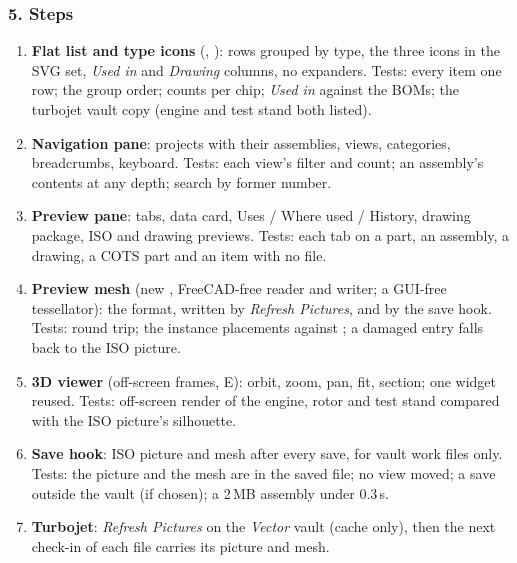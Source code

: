 \subsubsection*{5. Steps}

\begin{enumerate}[nosep]
  \item \textbf{Flat list and type icons} (, ): rows grouped by
        type, the three icons in the SVG set, \emph{Used in} and \emph{Drawing} columns, no expanders. Tests: every item
        one row; the group order; counts per chip; \emph{Used in} against the BOMs; the turbojet vault copy (engine and
        test stand both listed).
  \item \textbf{Navigation pane}: projects with their assemblies, views, categories, breadcrumbs, keyboard. Tests:
        each view's filter and count; an assembly's contents at any depth; search by former number.
  \item \textbf{Preview pane}: tabs, data card, Uses / Where used / History, drawing package, ISO and drawing previews.
        Tests: each tab on a part, an assembly, a drawing, a COTS part and an item with no file.
  \item \textbf{Preview mesh} (new , FreeCAD-free reader and writer; a GUI-free
        tessellator): the format, written by \emph{Refresh Pictures}, and by the save hook. Tests: round trip; the
        instance placements against ; a damaged entry falls back to the ISO picture.
  \item \textbf{3D viewer} (off-screen frames, E): orbit, zoom, pan, fit, section; one widget reused. Tests: off-screen
        render of the engine, rotor and test stand compared with the ISO picture's silhouette.
  \item \textbf{Save hook}: ISO picture and mesh after every save, for vault work files only. Tests: the picture
        and the mesh are in the saved file; no view moved; a save outside the vault (if chosen); a 2\,MB assembly
        under 0.3\,s.
  \item \textbf{Turbojet}: \emph{Refresh Pictures} on the \emph{Vector} vault (cache only), then the next check-in
        of each file carries its picture and mesh.
\end{enumerate}

